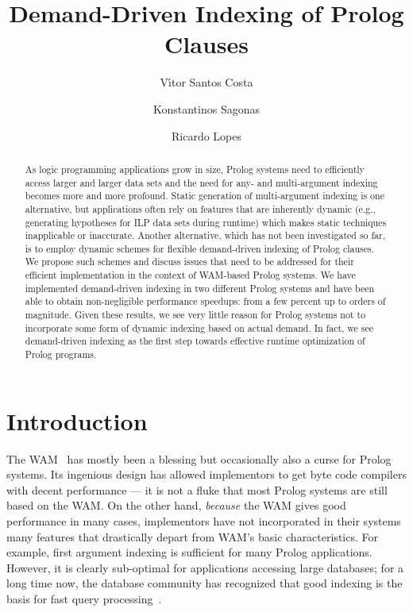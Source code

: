 \documentclass{llncs}
\title{Demand-Driven Indexing of Prolog Clauses}
\author{V\'{\i}tor Santos Costa\inst{1} \and Konstantinos
  Sagonas\inst{2} \and Ricardo Lopes\inst{1}}
\institute{
  University of Porto, Portugal
  \and
  National Technical University of Athens, Greece
}
\begin{document}
\maketitle

\begin{abstract}
  As logic programming applications grow in size, Prolog systems need
  to efficiently access larger and larger data sets and the need for
  any- and multi-argument indexing becomes more and more profound.
  Static generation of multi-argument indexing is one alternative, but
  applications often rely on features that are inherently dynamic
  (e.g., generating hypotheses for ILP data sets during runtime) which
  makes static techniques inapplicable or inaccurate. Another
  alternative, which has not been investigated so far, is to employ
  dynamic schemes for flexible demand-driven indexing of Prolog
  clauses. We propose such schemes and discuss issues that need to be
  addressed for their efficient implementation in the context of
  WAM-based Prolog systems. We have implemented demand-driven indexing
  in two different Prolog systems and have been able to obtain
  non-negligible performance speedups: from a few percent up to orders
  of magnitude. Given these results, we see very little reason for
  Prolog systems not to incorporate some form of dynamic indexing
  based on actual demand. In fact, we see demand-driven indexing as
  the first step towards effective runtime optimization of Prolog
  programs.
\end{abstract}


\section{Introduction}
The WAM~\cite{Warren83} has mostly been a blessing but occasionally
also a curse for Prolog systems. Its ingenious design has allowed
implementors to get byte code compilers with decent performance --- it
is not a fluke that most Prolog systems are still based on the WAM. On
the other hand, \emph{because} the WAM gives good performance in many
cases, implementors have not incorporated in their systems many
features that drastically depart from WAM's basic characteristics.
%
For example, first argument indexing is sufficient for many Prolog
applications. However, it is clearly sub-optimal for applications
accessing large databases; for a long time now, the database community
has recognized that good indexing is the basis for fast query
processing~\cite{}.
\end{document}
